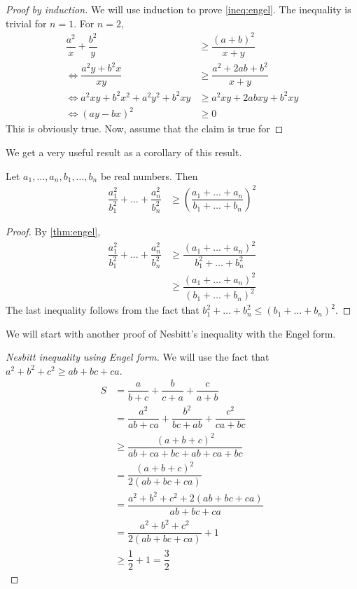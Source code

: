 \documentclass{subfile}
\begin{document}
		\begin{proof}[Proof by induction]
			We will use induction to prove \ref{ineq:engel}. The inequality is trivial for $n=1$. For $n=2$,
				\begin{align*}
					\dfrac{a^2}{x}+\dfrac{b^2}{y}
						& \geq\dfrac{(a+b)^2}{x+y}\\
					\iff\dfrac{a^2y+b^2x}{xy}
						& \geq\dfrac{a^2+2ab+b^2}{x+y}\\
					\iff a^2xy+b^2x^2+a^2y^2+b^2xy
						& \geq a^2xy+2abxy+b^2xy\\
					\iff (ay-bx)^2
						& \geq0
				\end{align*}
			This is obviously true. Now, assume that the claim is true for 
		\end{proof}
	We get a very useful result as a corollary of this result.
		\begin{theorem}
			Let $a_1,\ldots,a_n,b_1,\ldots,b_n$ be real numbers. Then
				\begin{align*}
					\dfrac{a_1^2}{b_1^2}+\ldots+\dfrac{a_n^2}{b_n^2}
						& \geq\left(\dfrac{a_1+\ldots+a_n}{b_1+\ldots+b_n}\right)^2
				\end{align*}
		\end{theorem}
	
		\begin{proof}
			By \autoref{thm:engel},
				\begin{align*}
					\dfrac{a_1^2}{b_1^2}+\ldots+\dfrac{a_n^2}{b_n^2}
						& \geq\dfrac{(a_1+\ldots+a_n)^2}{b_1^2+\ldots+b_n^2}\\
						& \geq\dfrac{(a_1+\ldots+a_n)^2}{(b_1+\ldots+b_n)^2}
				\end{align*}
			The last inequality follows from the fact that $b_1^2+\ldots+b_n^2\leq(b_1+\ldots+b_n)^2$.
		\end{proof}
	We will start with another proof of Nesbitt's inequality with the Engel form.
		\begin{proof}[Nesbitt inequality using Engel form]
			We will use the fact that $a^2+b^2+c^2\geq ab+bc+ca$.
				\begin{align*}
					S
						& = \dfrac{a}{b+c}+\dfrac{b}{c+a}+\dfrac{c}{a+b}\\
						& = \dfrac{a^2}{ab+ca}+\dfrac{b^2}{bc+ab}+\dfrac{c^2}{ca+bc}\\
						& \geq\dfrac{(a+b+c)^2}{ab+ca+bc+ab+ca+bc}\\
						& = \dfrac{(a+b+c)^2}{2(ab+bc+ca)}\\
						& = \dfrac{a^2+b^2+c^2+2(ab+bc+ca)}{ab+bc+ca}\\
						& = \dfrac{a^2+b^2+c^2}{2(ab+bc+ca)}+1\\
						& \geq\dfrac{1}{2}+1=\dfrac{3}{2}
				\end{align*}
		\end{proof}
	
\end{document}

